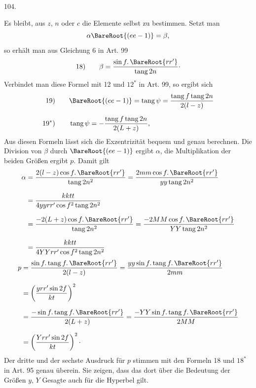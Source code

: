 \par{}\medskip
\hypertarget{native-143-article104}{}
\begin{center}104.\end{center}
Es bleibt, aus $z$, $n$ oder $c$ die Elemente selbst zu bestimmen. Setzt man
\[
\alpha\BareRoot{(ee-1)}=\beta,
\]
\noindent so erhält man aus Gleichung 6 in Art. 99
\[
\mathrm{18)}\qquad\beta=\frac{\sin f\mathpunct{.}\BareRoot{rr'}}{\operatorname{tang}2n}\mathpunct{\cdot}
\]
\noindent Verbindet man diese Formel mit 12 und $12^*$ in Art. 99, so ergibt sich
\[
\begin{aligned}
\mathrm{19)}\qquad&\BareRoot{(ee-1)}=\operatorname{tang}\psi=\frac{\operatorname{tang}f\operatorname{tang}2n}{2(l-z)}\\[.6em]
\mathrm{19^*)}\qquad&\operatorname{tang}\psi=-\frac{\operatorname{tang}f\operatorname{tang}2n}{2(L+z)},
\end{aligned}
\]
\noindent Aus diesen Formeln lässt sich die Exzentrizität bequem und genau berechnen. Die Division von $\beta$ durch $\BareRoot{(ee-1)}$ ergibt $\alpha$, die Multiplikation der beiden Größen ergibt $p$. Damit gilt
\[
\begin{aligned}
\alpha&=\frac{2(l-z)\cos f\mathpunct{.}\BareRoot{rr'}}{\operatorname{tang}2n^2}
=\frac{2mm\cos f\mathpunct{.}\BareRoot{rr'}}{yy\operatorname{tang}2n^2}\\[.7em]
&=\frac{kktt}{4yyrr'\cos f^2\operatorname{tang}2n^2}\\[.7em]
&=\frac{-2(L+z)\cos f\mathpunct{.}\BareRoot{rr'}}{\operatorname{tang}2n^2}
=\frac{-2MM\cos f\mathpunct{.}\BareRoot{rr'}}{YY\operatorname{tang}2n^2}\\[.7em]
&=\frac{kktt}{4YYrr'\cos f^2\operatorname{tang}2n^2}
\end{aligned}
\]
\[
\begin{aligned}
p&=\frac{\sin f\mathpunct{.}\operatorname{tang}f\mathpunct{.}\BareRoot{rr'}}{2(l-z)}
=\frac{yy\sin f\mathpunct{.}\operatorname{tang}f\mathpunct{.}\BareRoot{rr'}}{2mm}\\[.7em]
&=\left(\frac{yrr'\sin2f}{kt}\right)^2\\[.7em]
&=\frac{-\sin f\mathpunct{.}\operatorname{tang}f\mathpunct{.}\BareRoot{rr'}}{2(L+z)}
=\frac{-YY\sin f\mathpunct{.}\operatorname{tang}f\mathpunct{.}\BareRoot{rr'}}{2MM}\\[.7em]
&=\left(\frac{Yrr'\sin2f}{kt}\right)^2\mathpunct{\cdot}
\end{aligned}
\]
\noindent{}Der dritte und der sechste Ausdruck für $p$ stimmen mit den Formeln 18 und $18^*$ in Art. 95 genau überein. Sie zeigen, dass das dort über die Bedeutung der Größen $y$, $Y$ Gesagte auch für die Hyperbel gilt.
